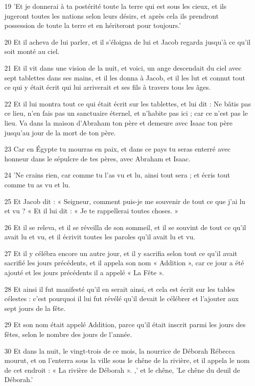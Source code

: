 \par 19 'Et je donnerai à ta postérité toute la terre qui est sous les cieux, et ils jugeront toutes les nations selon leurs désirs, et après cela ils prendront possession de toute la terre et en hériteront pour toujours.'
\par 20 Et il acheva de lui parler, et il s'éloigna de lui et Jacob regarda jusqu'à ce qu'il soit monté au ciel.
\par 21 Et il vit dans une vision de la nuit, et voici, un ange descendait du ciel avec sept tablettes dans ses mains, et il les donna à Jacob, et il les lut et connut tout ce qui y était écrit qui lui arriverait et ses fils à travers tous les âges.
\par 22 Et il lui montra tout ce qui était écrit sur les tablettes, et lui dit : Ne bâtis pas ce lieu, n'en fais pas un sanctuaire éternel, et n'habite pas ici ; car ce n'est pas le lieu. Va dans la maison d'Abraham ton père et demeure avec Isaac ton père jusqu'au jour de la mort de ton père.
\par 23 Car en Égypte tu mourras en paix, et dans ce pays tu seras enterré avec honneur dans le sépulcre de tes pères, avec Abraham et Isaac.
\par 24 'Ne crains rien, car comme tu l'as vu et lu, ainsi tout sera ; et écris tout comme tu as vu et lu.
\par 25 Et Jacob dit : « Seigneur, comment puis-je me souvenir de tout ce que j'ai lu et vu ? « Et il lui dit : « Je te rappellerai toutes choses. »
\par 26 Et il se releva, et il se réveilla de son sommeil, et il se souvint de tout ce qu'il avait lu et vu, et il écrivit toutes les paroles qu'il avait lu et vu.
\par 27 Et il y célébra encore un autre jour, et il y sacrifia selon tout ce qu'il avait sacrifié les jours précédents, et il appela son nom « Addition », car ce jour a été ajouté et les jours précédents il a appelé « La Fête ».
\par 28 Et ainsi il fut manifesté qu'il en serait ainsi, et cela est écrit sur les tables célestes : c'est pourquoi il lui fut révélé qu'il devait le célébrer et l'ajouter aux sept jours de la fête.
\par 29 Et son nom était appelé Addition, parce qu'il était inscrit parmi les jours des fêtes, selon le nombre des jours de l'année.
\par 30 Et dans la nuit, le vingt-trois de ce mois, la nourrice de Déborah Rébecca mourut, et on l'enterra sous la ville sous le chêne de la rivière, et il appela le nom de cet endroit : « La rivière de Déborah ». ,' et le chêne, 'Le chêne du deuil de Déborah.'
